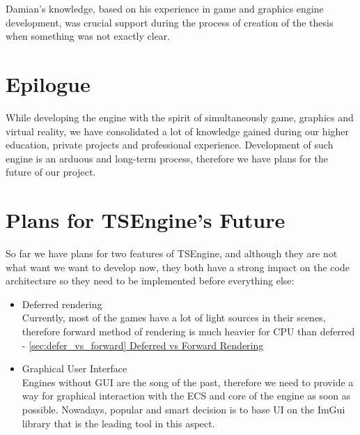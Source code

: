 Damian's knowledge, based on his experience in game and graphics engine development, was crucial support during the process of creation of the thesis when something was not exactly clear.  

\section{Epilogue}
While developing the engine with the spirit of simultaneously game, graphics and virtual reality, we have consolidated a lot of knowledge gained during our higher education, private projects and professional experience. Development of such engine is an arduous and long-term process, therefore we have plans for the future of our project. 
\section{Plans for TSEngine's Future}
\label{sec:future}
So far we have plans for two features of TSEngine, and although they are not what want we want to develop now, they both have a strong impact on the code architecture so they need to be implemented before everything else: 
\begin{itemize}
    \item Deferred rendering\\
    Currently, most of the games have a lot of light sources in their scenes, therefore forward method of rendering is much heavier for CPU than deferred - \hyperref[sec:defer_vs_forward]{\ref*{sec:defer_vs_forward} Deferred vs Forward Rendering}
    \item Graphical User Interface\\
    Engines without GUI are the song of the past, therefore we need to  provide a way for graphical interaction with the ECS and core of the engine as soon as possible. Nowadays, popular and smart decision is to base UI on the ImGui library that is the leading tool in this aspect.  
\end{itemize}